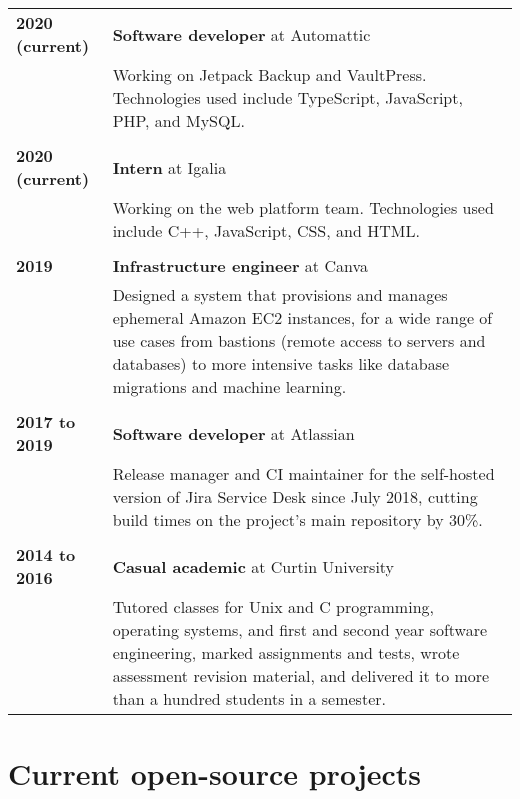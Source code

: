 \documentclass[a4paper,12pt]{article}
\begin{document}
\begin{tabular}{p{35mm}p{125mm}}
	                    \textbf{2020 (current)}     & \textbf{Software developer} at Automattic
	\vspace{0.2em}  \\                              & Working on Jetpack Backup and VaultPress. Technologies used include TypeScript, JavaScript, PHP, and MySQL.
	\\              \\  \textbf{2020 (current)}     & \textbf{Intern} at Igalia
	\vspace{0.2em}  \\                              & Working on the web platform team. Technologies used include C++, JavaScript, CSS, and HTML.
	\\              \\  \textbf{2019}               & \textbf{Infrastructure engineer} at Canva
	\vspace{0.2em}  \\                              & Designed a system that provisions and manages ephemeral Amazon EC2 instances, for a wide range of use cases from bastions (remote access to servers and databases) to more intensive tasks like database migrations and machine learning.
	\\              \\  \textbf{2017 to 2019}       & \textbf{Software developer} at Atlassian
	\vspace{0.2em}  \\                              & Release manager and CI maintainer for the self-hosted version of Jira Service Desk since July 2018, cutting build times on the project’s main repository by 30\%.
	\\              \\  \textbf{2014 to 2016}       & \textbf{Casual academic} at Curtin University
	\vspace{0.2em}  \\                              & Tutored classes for Unix and C programming, operating systems, and first and second year software engineering, marked assignments and tests, wrote assessment revision material, and delivered it to more than a hundred students in a semester.
\end{tabular}

\section*{Current open-source projects}
\end{document}
